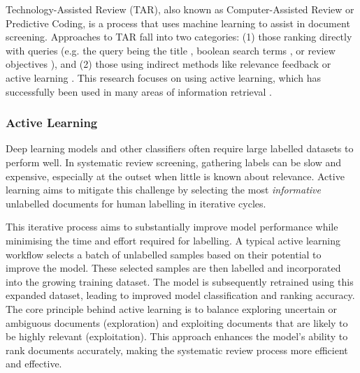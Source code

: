 \documentclass[10pt, english]{article}
\begin{document}
Technology-Assisted Review (TAR), also known as Computer-Assisted Review or Predictive Coding, is a process that uses machine learning to assist in document screening. Approaches to TAR fall into two categories: (1) those ranking directly with queries (e.g. the query being the title \cite{alharbi_ranking_2017, alharbi_retrieving_2018}, boolean search terms  \cite{alharbi_ranking_2017, alharbi_retrieving_2018, alharbi_ranking_2019}, or review objectives \cite{ferro_qut_2017, scells_integrating_2017}), and (2) those using indirect methods like relevance feedback \cite{alharbi_ranking_2019} or active learning \cite{cormack_technology-assisted_2017, cormack_systems_2019, grossman_technology-assisted_2010, grossman_automatic_2017}. This research focuses on using active learning, which has successfully been used in many areas of information retrieval \cite{cormack_autonomy_2015, cormack_engineering_2016, yu_fast2_2019, yu_finding_2018, miwa_reducing_2014}.

\subsubsection{Active Learning}

Deep learning models and other classifiers often require large labelled datasets to perform well. In systematic review screening, gathering labels can be slow and expensive, especially at the outset when little is known about relevance. Active learning aims to mitigate this challenge by selecting the most \emph{informative} unlabelled documents for human labelling in iterative cycles.

This iterative process aims to substantially improve model performance while minimising the time and effort required for labelling. A typical active learning workflow selects a batch of unlabelled samples based on their potential to improve the model. These selected samples are then labelled and incorporated into the growing training dataset. The model is subsequently retrained using this expanded dataset, leading to improved model classification and ranking accuracy. The core principle behind active learning is to balance exploring uncertain or ambiguous documents (exploration) and exploiting documents that are likely to be highly relevant (exploitation). This approach enhances the model's ability to rank documents accurately, making the systematic review process more efficient and effective.
\end{document}
